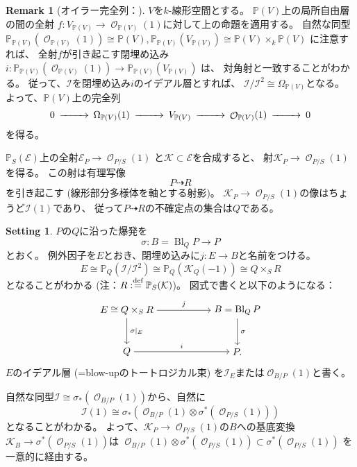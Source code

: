 \documentclass[uplatex]{jsarticle}
\theoremstyle{definition}
\newtheorem{rem}[rem]{Remark}
\newtheorem*{setting*}{Setting}
\DeclareMathOperator{\Bl}{\mathrm{Bl}}
\renewcommand{\P}{\mathbb{P}}
\newcommand{\mcE}{\mathcal{E}}
\newcommand{\mcI}{\mathcal{I}}
\newcommand{\mcK}{\mathcal{K}}
\newcommand{\mcO}{\mathcal{O}}
\DeclareMathOperator{\OOO}{\mcO}
\newcommand{\OO}[1]{\OOO_{#1}}
\newcommand{\dto}{\dashrightarrow}
\def\dfn{:\overset{\mbox{{\scriptsize def}}}{=}}
\begin{document}
\begin{rem}[オイラー完全列：{\cite[命題8.13]{Ha}}]
  \(V\)を\(k\)-線形空間とする。
  \(\P(V)\)上の局所自由層の間の全射
  \(f:V_{\P(V)} \to \OO{\P(V)}(1)\)に対して上の命題を適用する。
  自然な同型
  \(\P_{\P(V)}(\OO{\P(V)}(1)) \cong \P(V), \P_{\P(V)}(V_{\P(V)}) \cong \P(V) \times_k \P(V)\)
  に注意すれば、
  全射\(f\)が引き起こす閉埋め込み
  \(i:\P_{\P(V)}(\OO{\P(V)}(1)) \to \P_{\P(V)}(V_{\P(V)})\)
  は、
  対角射と一致することがわかる。
  従って、\(\mcI\)を閉埋め込み\(i\)のイデアル層とすれば、
  \(\mcI/\mcI^2 \cong \Omega_{\P(V)}\)となる。
  よって、\(\P(V)\)上の完全列
  \[
  \begin{CD}
    0 @>>> \Omega_{\P(V)}(1) @>>> V_{\P(V)} @>>> \OO{\P(V)}(1) @>>> 0
  \end{CD}
  \]
  を得る。
\end{rem}


\(\P_S(\mcE)\)上の全射\(\mcE_P\to \OO{P/S}(1)\)
と\(\mcK\subset \mcE\)を合成すると、
射\(\mcK_P\to \OO{P/S}(1)\)を得る。
この射は有理写像
\[
P\dto R
\]
を引き起こす (線形部分多様体を軸とする射影)。
\(\mcK_P\to \OO{P/S}(1)\)の像はちょうど\(\mcI(1)\)であり、
従って\(P\dto R\)の不確定点の集合は\(Q\)である。


\begin{setting*}
  \(P\)の\(Q\)に沿った爆発を
  \[
  \sigma :B = \Bl_QP\to P
  \]
  とおく。
  例外因子を\(E\)とおき、閉埋め込みに\(j:E\to B\)と名前をつける。
  \[E\cong \P_Q(\mcI/\mcI^2)\cong \P_Q(\mcK_Q(-1)) \cong Q\times_SR\]
  となることがわかる
  (注：\(R\dfn \P_S(\mcK)\))。
  図式で書くと以下のようになる：
  \[
  \begin{tikzpicture}[auto]
    \node (B) at (0,1.5) {\(E \cong Q\times_SR\)};
    \node (A) at (0,0) {\(Q\)};
    \node (B') at (4,1.5) {\(B = \Bl_QP\)};
    \node (A') at (4,0) {\(P. \)};
    \draw[->] (B) to node{\scriptsize \(\sigma|_E\)} (A);
    \draw[->] (B) to node{\scriptsize \(j\)} (B');
    \draw[->] (B') to node{\scriptsize \(\sigma\)} (A');
    \draw[->] (A) to node{\scriptsize \(i\)} (A');
  \end{tikzpicture}
  \]
  \(E\)のイデアル層 (=blow-upのトートロジカル束)
  を\(\mcI_E\)または\(\OO{B/P}(1)\)と書く。
\end{setting*}


自然な同型\(\mcI \cong \sigma_*(\OO{B/P}(1))\)から、自然に
\[
\mcI(1) \cong \sigma_*(\OO{B/P}(1)\otimes \sigma^*(\OO{P/S}(1)))
\]
となることがわかる。
よって、\(\mcK_P\to \OO{P/S}(1)\)の\(B\)への基底変換
\(\mcK_B\to \sigma^*(\OO{P/S}(1))\)は
\(\OO{B/P}(1)\otimes \sigma^*(\OO{P/S}(1)) \subset \sigma^*(\OO{P/S}(1))\)
を一意的に経由する。
\end{document}

